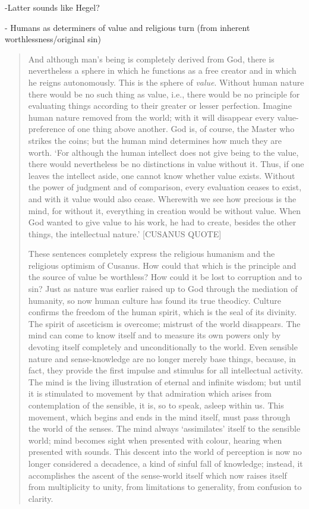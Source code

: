 -Latter sounds like Hegel?

- Humans as determiners of value and religious turn (from inherent worthlessness/original sin) 

\begin{quote}
    And although man's being is completely derived from God, there is nevertheless a sphere in which he functions as a free creator and in which he reigns autonomously.  This is the sphere of \emph{value}. Without human nature there would be no such thing as value, i.e., there would be no principle for evaluating things according to their greater or lesser perfection.  Imagine human nature removed from the world; with it will disappear every value-preference of one thing above another.  God is, of course, the Master who strikes the coins; but the human mind determines how much they are worth.  `For although the human intellect does not give being to the value, there would nevertheless be no distinctions in value without it.  Thus, if one leaves the intellect aside, one cannot know whether value exists.  Without the power of judgment and of comparison, every evaluation ceases to exist, and with it value would also cease.  Wherewith we see how precious is the mind, for without it, everything in creation would be without value.  When God wanted to give value to his work, he had to create, besides the other things, the intellectual nature.'  [CUSANUS QUOTE]

    These sentences completely express the religious humanism and the religious optimism of Cusanus.  How could that which is the principle and the source of value be worthless?  How could it be lost to corruption and to sin?  Just as nature was earlier raised up to God through the mediation of humanity, so now human culture has found its true theodicy.  Culture confirms the freedom of the human spirit, which is the seal of its divinity.  The spirit of asceticism is overcome; mistrust of the world disappears.  The mind can come to know itself and to measure its own powers only by devoting itself completely and unconditionally to the world.  Even sensible nature and sense-knowledge are no longer merely base things, because, in fact, they provide the first impulse and stimulus for all intellectual activity.  The mind is the living illustration of eternal and infinite wisdom; but until it is stimulated to movement by that admiration which arises from contemplation of the sensible, it is, so to speak, asleep within us.  This movement, which begins and ends in the mind itself, must pass through the world of the senses.  The mind always `assimilates' itself to the sensible world; mind becomes sight when presented with colour, hearing when presented with sounds.  This descent into the world of perception is now no longer considered a decadence, a kind of sinful fall of knowledge; instead, it accomplishes the ascent of the sense-world itself which now raises itself from multiplicity to unity, from limitations to generality, from confusion to clarity.  
    

\end{quote}
